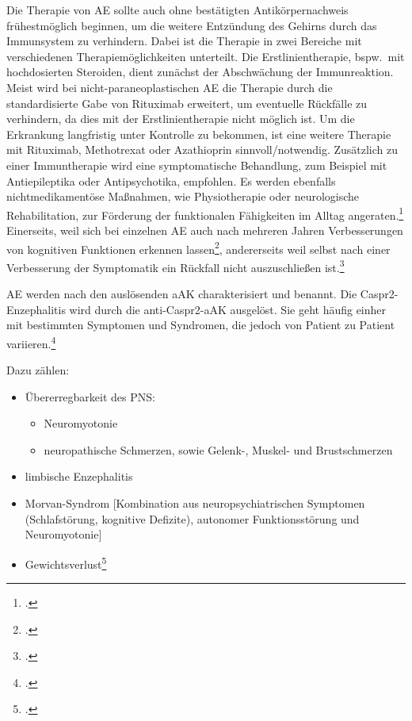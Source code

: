 \clearpage
Die Therapie von AE sollte auch ohne bestätigten Antikörpernachweis
frühestmöglich beginnen, um die weitere Entzündung des Gehirns durch das
Immunsystem zu verhindern. Dabei ist die Therapie in zwei Bereiche mit
verschiedenen Therapiemöglichkeiten unterteilt. Die Erstlinientherapie,
bspw.\ mit hochdosierten Steroiden, dient zunächst der Abschwächung der
Immunreaktion. Meist wird bei nicht-paraneoplastischen AE die Therapie
durch die standardisierte Gabe von Rituximab erweitert, um eventuelle
Rückfälle zu verhindern, da dies mit der Erstlinientherapie nicht möglich
ist. Um die Erkrankung langfristig unter Kontrolle zu bekommen, ist eine
weitere Therapie mit Rituximab, Methotrexat oder Azathioprin
sinnvoll/notwendig. Zusätzlich zu einer Immuntherapie wird eine
symptomatische Behandlung, zum Beispiel mit Antiepileptika oder
Antipsychotika, empfohlen. Es werden ebenfalls nichtmedikamentöse
Maßnahmen, wie Physiotherapie oder neurologische Rehabilitation, zur
Förderung der funktionalen Fähigkeiten im Alltag
angeraten.\footcite[S.~533]{Heine2022}
Einerseits, weil sich bei einzelnen AE auch nach mehreren Jahren
Verbesserungen von kognitiven Funktionen erkennen
lassen\footcite[S.~534]{Heine2022}, andererseits weil selbst nach einer
Verbesserung der Symptomatik ein Rückfall nicht auszuschließen
ist.\footcite[S.~11]{Lancaster2015}


AE werden nach den auslösenden aAK charakterisiert und benannt. Die
Caspr2-Enzephalitis wird durch die anti-Caspr2-aAK ausgelöst. Sie geht
häufig einher mit bestimmten Symptomen und Syndromen, die jedoch von
Patient zu Patient variieren.\footcite[S.~525--526]{VanSonderen2016}

Dazu zählen:
\begin{itemize}
	\item Übererregbarkeit des PNS:
	\begin{itemize}
		\item Neuromyotonie
		\item neuropathische Schmerzen, sowie Gelenk-, Muskel- und
		Brustschmerzen
	\end{itemize}
	\item limbische Enzephalitis
	\item Morvan-Syndrom [Kombination aus neuropsychiatrischen Symptomen
	(Schlafstörung, kognitive Defizite), autonomer
	Funktionsstörung und Neuromyotonie]
	\item Gewichtsverlust\footcites[S.~523; 526]{VanSonderen2016}%
	[S.~527; 530]{Heine2022}
\end{itemize}

